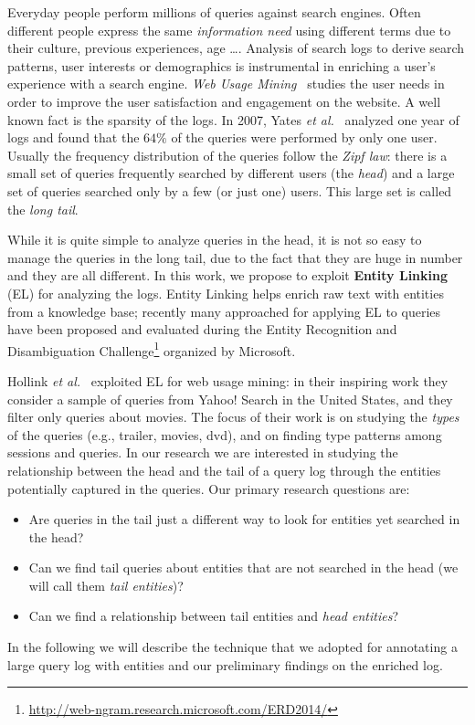
Everyday people perform millions of queries against search engines. Often different people express
the same \emph{information need} using different terms due to their culture, previous experiences,
age \dots. 
Analysis of search logs to derive search patterns, user interests or demographics is instrumental 
in enriching a user's experience with a search engine.   
\emph{Web Usage Mining}~\cite{silvestri2010mining}  
studies the user needs in order to improve the user satisfaction and engagement on the website. 
A well known fact is the sparsity of the logs. In 2007, Yates \emph{ et al.}~\cite{baeza2007impact} 
analyzed one year of logs and found that the $64\%$ of the queries were performed by only one user.
Usually the frequency distribution of the queries follow the \emph{Zipf law}: there is a small 
set of queries frequently searched by different users (the \emph{head}) and a large set of queries
searched only by a few (or just one) users. This large set is called the \emph{long tail}.

While it is quite simple to analyze queries in the head, it is not so easy to manage the queries in the long tail, 
due to the fact that they are huge in number and they are all different. In this work, we propose
to exploit \textbf{Entity Linking} (EL) for analyzing the logs. Entity Linking helps enrich raw text with entities 
from a knowledge base; recently many approached for applying 
EL to queries have been proposed and evaluated during the Entity Recognition and Disambiguation Challenge\footnote{
\url{http://web-ngram.research.microsoft.com/ERD2014/}} organized by Microsoft. 

Hollink \emph{et al.}~\cite{hollink2013web} exploited EL for web usage mining: 
in their inspiring work they consider a sample of 
queries from Yahoo! Search in the United States, and they filter only queries about movies. The focus
of their work is on studying the \emph{types} of the queries (e.g., trailer, movies, dvd), and on finding
type patterns among sessions and queries. In our research we are interested in studying the 
relationship between the head and the tail of a query log
through the entities potentially captured in the queries. Our primary research questions are:
\begin{itemize}
	\item Are queries in the tail just a different way to look for entities yet searched in the head? 
	\item Can we find tail queries about entities that are not searched in the head (we will call them \emph{tail entities})?
	\item Can we find a relationship between tail entities and \emph{head entities}?  
\end{itemize} 

In the following we will describe the technique that we adopted for annotating a large query log with entities 
and our preliminary findings on the enriched log.


 
